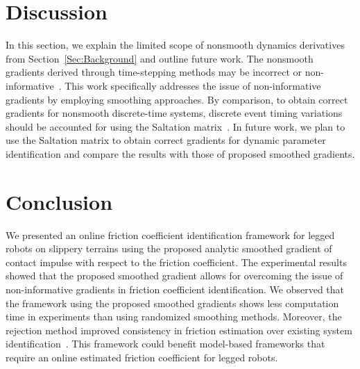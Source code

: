 
\section{Discussion}\label{Sec:Discussion}
In this section, we explain the limited scope of nonsmooth dynamics derivatives from Section~\ref{Sec:Background} and outline future work. The nonsmooth gradients derived through time-stepping methods may be incorrect or non-informative~\cite{kong2024saltation,le2024leveraging,werling2021fast}. This work specifically addresses the issue of non-informative gradients by employing smoothing approaches. By comparison, to obtain correct gradients for nonsmooth discrete-time systems, discrete event timing variations should be accounted for using the Saltation matrix~\cite{kong2024saltation}. In future work, we plan to use the Saltation matrix to obtain correct gradients for dynamic parameter identification and compare the results with those of proposed smoothed gradients.

\section{Conclusion} \label{Sec:Conclusion}
We presented an online friction coefficient identification framework for legged robots on slippery terrains using the proposed analytic smoothed gradient of contact impulse with respect to the friction coefficient. The experimental results showed that the proposed smoothed gradient allows for overcoming the issue of non-informative gradients in friction coefficient identification. We observed that the framework using the proposed smoothed gradients shows less computation time in experiments than using randomized smoothing methods. Moreover, the rejection method improved consistency in friction estimation over existing system identification~\cite{chen2022real}. This framework could benefit model-based frameworks that require an online estimated friction coefficient for legged robots. 

